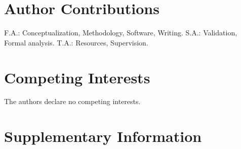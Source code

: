 \documentclass[12pt]{article}
\begin{document}
\section*{Author Contributions}
F.A.: Conceptualization, Methodology, Software, Writing. S.A.: Validation, Formal analysis. T.A.: Resources, Supervision.

\section*{Competing Interests}
The authors declare no competing interests.




\newpage
\section*{Supplementary Information}

\end{document}
